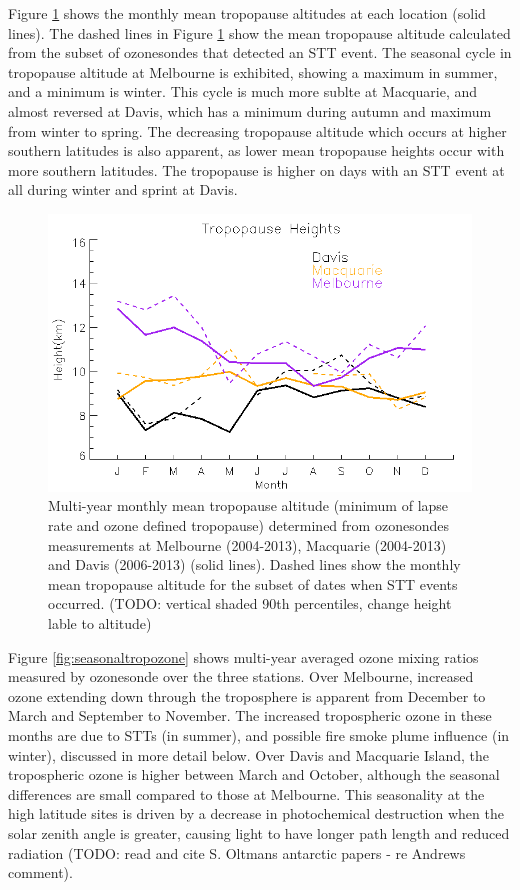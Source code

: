 \documentclass{article}
\begin{document}
    Figure \ref{fig:seasonaltpheights} shows the monthly mean tropopause altitudes at each location (solid lines).
    The dashed lines in Figure \ref{fig:seasonaltpheights} show the mean tropopause altitude calculated from the subset of ozonesondes that detected an STT event.
    The seasonal cycle in tropopause altitude at Melbourne is exhibited, showing a maximum in summer, and a minimum is winter.
    This cycle is much more sublte at Macquarie, and almost reversed at Davis, which has a minimum during autumn and maximum from winter to spring.
    The decreasing tropopause altitude which occurs at higher southern latitudes is also apparent, as lower mean tropopause heights occur with more southern latitudes.
    The tropopause is higher on days with an STT event at all during winter and sprint at Davis.

    \begin{figure}[!htbp]
	\begin{center}
	\includegraphics[width=0.8\columnwidth]{figures/tpheights}
	\caption{Multi-year monthly mean tropopause altitude (minimum of lapse rate and ozone defined tropopause) determined from ozonesondes measurements at Melbourne (2004-2013), Macquarie (2004-2013) and Davis (2006-2013) (solid lines).
	Dashed lines show the monthly mean tropopause altitude for the subset of dates when STT events occurred. 
	(TODO: vertical shaded 90th percentiles, change height lable to altitude)
	}
	\label{fig:seasonaltpheights}
	\end{center}
    \end{figure}

    Figure \ref{fig:seasonaltropozone} shows multi-year averaged ozone mixing ratios measured by ozonesonde over the three stations.
    Over Melbourne, increased ozone extending down through the troposphere is apparent from December to March and September to November.
    The increased tropospheric ozone in these months are due to STTs (in summer), and possible fire smoke plume influence (in winter), discussed in more detail below.
    Over Davis and Macquarie Island, the tropospheric ozone is higher between March and October, although the seasonal differences are small compared to those at Melbourne.
    This seasonality at the high latitude sites is driven by a decrease in photochemical destruction when the solar zenith angle is greater, causing light to have longer path length and reduced radiation (TODO: read and cite S. Oltmans antarctic papers - re Andrews comment).
    
\end{document}
